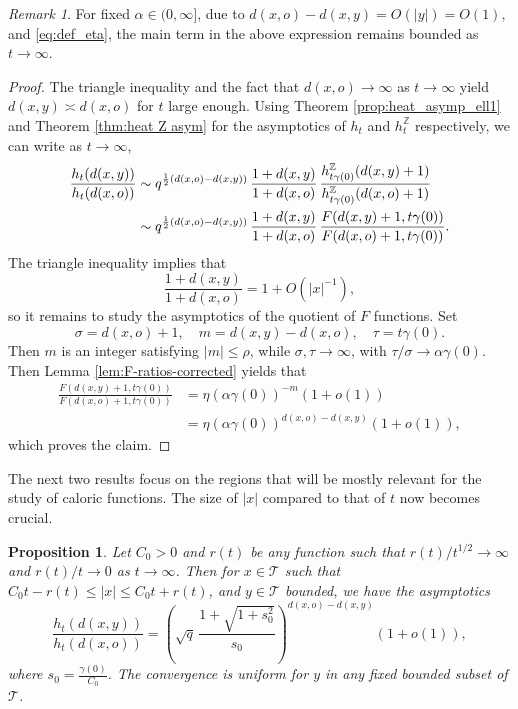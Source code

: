 \documentclass[11pt,a4paper,reqno]{amsart}
\renewcommand\mathcal{\mathscr}
\theoremstyle{plain}
\newtheorem{proposition}[theorem]{Proposition}
\theoremstyle{remark}
\newtheorem{remark}[theorem]{Remark}
\theoremstyle{definition}
\theoremstyle{remark}
\numberwithin{equation}{section}
\begin{document}
\begin{remark}
    For fixed $\alpha\in(0,\infty]$, due to 
$d(x,o)-d(x,y)=O(|y|)=O(1),
$
and \eqref{eq:def_eta},
the main term in the above expression remains bounded as $t\to\infty$.
\end{remark}

    \begin{proof}  The triangle inequality and the fact that $d(x,o)\to \infty$ as $t\to \infty$ yield $d(x,y)\asymp d(x,o)$ for $t$ large enough. 
    Using Theorem \ref{prop:heat_asymp_ell1} and Theorem \ref{thm:heat Z asym} for the asymptotics of $h_t$ and $h_t^{\mathbb{Z}}$ respectively, we can write as $t\to \infty$,
		\begin{align}\label{eq:quotientforL1}
			\frac{h_{t}(d(x,y))}{h_{t}(d(x,o))}&\sim q^{\frac{1}{2}(d(x,o)-d(x,y))}\,\frac{1+d(x,y)}{1+d(x,o)}\,  \frac{h_{t\gamma(0)}^{\mathbb{Z}}(d(x,y)+1)}{h_{t\gamma(0)}^{\mathbb{Z}}(d(x,o)+1)} \notag\\
            &\sim q^{\frac{1}{2}(d(x,o)-d(x,y))}\,\frac{1+d(x,y)}{1+d(x,o)}\,  \frac{F(d(x,y)+1, t\gamma(0))}{F(d(x,o)+1, t\gamma(0))}.
		\end{align}
		The triangle inequality implies that $$\frac{1+d(x,y)}{1+d(x,o)} =1+O(|x|^{-1}),$$ so it remains to study the asymptotics of the quotient of $F$ functions. Set 
        \[
        \sigma=d(x,o)+1,\quad m=d(x,y)-d(x,o), \quad \tau=t\gamma(0).
        \]
        Then $m$ is an integer satisfying $|m|\leq \rho$, while $\sigma, \tau \to \infty$, with $\tau/\sigma \to \alpha\gamma(0)$. Then Lemma \ref{lem:F-ratios-corrected} yields that 
        \begin{align*}
        \frac{F(d(x,y)+1, t\gamma(0))}{F(d(x,o)+1, t\gamma(0))}&=\eta(\alpha\gamma(0))^{-m}(1+o(1))\\
        &=\eta(\alpha\gamma(0))^{d(x,o)-d(x,y)}(1+o(1)),
        \end{align*}
        which proves the claim.
\end{proof}


The next two results focus on the regions that will be mostly relevant for the study of caloric functions. The size of $|x|$ compared to that of $t$ now becomes crucial.
	
    \begin{proposition}\label{ratio_asym_L1}
		Let $C_0>0$ and $r(t)$ be any function such that $r(t) / t^{1 / 2} \to\infty$ and  $r(t)/t\to 0$ as $t \to\infty$. Then for $x\in \mathcal{T}$ such that $ C_0t-r(t)\leq|x|\leq C_0t+r(t)$, and $y\in \mathcal{T}$ bounded, we have the asymptotics
		\[
		\frac{h_t(d(x,y))}{h_t(d(x,o))}=\left(\sqrt{q}\, \frac{1+\sqrt{1+s_0^2}}{s_0}\right)^{d(x,o)-d(x,y)} (1+o(1)),\]
		where $s_0=\frac{\gamma(0)}{C_0}$. The convergence is uniform for $y$ in any fixed bounded subset of $\mathcal T$.
	\end{proposition}
	
\end{document}

